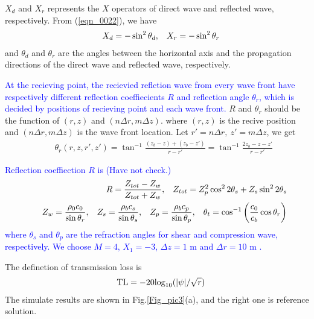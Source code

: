 \documentclass[journal,onecolumn]{IEEEtran}
\begin{document}
 
$X_d$ and $X_r$ represents the $X$ operators of direct wave and reflected wave, respectively.
From (\ref{eqn_0022}), we have
\begin{eqnarray}
&&X_d = - \sin^2 \theta_d, \hspace{0.3 cm} X_r = - \sin^2 \theta_r
\label{eqn_0028}
\end{eqnarray}
and $\theta_d$ and $\theta_r$ are the angles between the horizontal axis and the propagation directions of the direct wave 
and reflected wave, respectively.

\textcolor{blue}{At the recieving point, the recievied reflction wave from every wave front have respectively different reflection coeffiecients $R$ and reflection angle $\theta_r$, which is decided by positions of recieving point and each wave front.}
$R$ and $\theta_r$ should be the function of $(r, z)$ and $(n \Delta r, m \Delta z)$. 
where $(r, z)$ is the recive position and $(n \Delta r, m \Delta z)$ is the wave front location. 
Let $r' = n \Delta r, \ z' = m \Delta z$, we get
\begin{eqnarray}
&&\theta_r (r, z, r', z') = \tan^{-1} \frac{(z_b - z) + (z_b - z')}{r - r'} =  \tan^{-1} \frac{2 z_b - z - z'}{r - r'} 
\label{eqn_0029}
\end{eqnarray}

\textcolor{blue}{
Reflection coeffiection $R$ is \cite{FOA} \textcolor{dg}{(Have not check.)}
\begin{eqnarray}
&&R = \frac{Z_{tot} - Z_w}{Z_{tot} + Z_w}, \hspace{0.3 cm} Z_{tot} = Z_p^2 \cos^2 2\theta_s + Z_s \sin^2 2 \theta_s \\
\label{eqn_0031}
&& \hspace{0.3 cm} Z_w = \frac{\rho_0 c_0}{\sin \theta_r}
, \hspace{0.3 cm} Z_s = \frac{\rho_b c_s}{\sin \theta_s}
, \hspace{0.3 cm} Z_p = \frac{\rho_b c_p}{\sin \theta_p}
, \hspace{0.3 cm} \theta_t = \cos^{-1} \left( \frac{c_0}{c_b} \cos \theta_r \right )
\label{eqn_0031.1}
\end{eqnarray}
where $\theta_s$ and $\theta_p$ are the refraction angles for shear and compression wave, respectively. 
We choose $M = 4$, $X_1 = -3$, $\Delta z = 1$ m and $\Delta r = 10$ m \cite{MDC_HOPS}.
}

The definetion of transmission loss is
\begin{eqnarray}
&&{\rm TL} = - 20 {\rm log}_{10}(|\psi| / \sqrt{r})
\label{eqn_0031.2}
\end{eqnarray}
The simulate results are shown in Fig.\ref{Fig_pic3}(a), and the right one is reference solution. 
\end{document}
